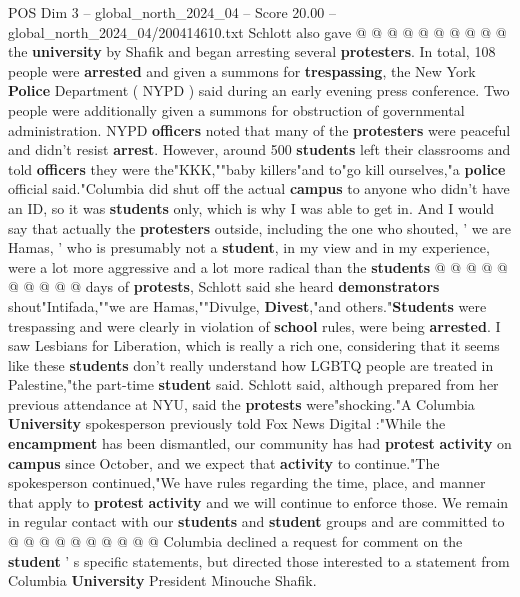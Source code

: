 \begin{textsample}{POS Dim 3 – global\_north\_2024\_04 – Score 20.00 – global\_north\_2024\_04/200414610.txt}
Schlott also gave @ @ @ @ @ @ @ @ @ @ the \textbf{university} by Shafik and began arresting several \textbf{protesters}.
In total, 108 people were \textbf{arrested} and given a summons for \textbf{trespassing}, the New York \textbf{Police} Department ( NYPD ) said during an early evening press conference.
Two people were additionally given a summons for obstruction of governmental administration.
NYPD \textbf{officers} noted that many of the \textbf{protesters} were peaceful and didn't resist \textbf{arrest}.
However, around 500 \textbf{students} left their classrooms and told \textbf{officers} they were the"KKK,""baby killers"and to"go kill ourselves,"a \textbf{police} official said."Columbia did shut off the actual \textbf{campus} to anyone who didn't have an ID, so it was \textbf{students} only, which is why I was able to get in.
And I would say that actually the \textbf{protesters} outside, including the one who shouted, ' we are Hamas, ' who is presumably not a \textbf{student}, in my view and in my experience, were a lot more aggressive and a lot more radical than the \textbf{students} @ @ @ @ @ @ @ @ @ @ days of \textbf{protests}, Schlott said she heard \textbf{demonstrators} shout"Intifada,""we are Hamas,""Divulge, \textbf{Divest},"and others."\textbf{Students} were trespassing and were clearly in violation of \textbf{school} rules, were being \textbf{arrested}.
I saw Lesbians for Liberation, which is really a rich one, considering that it seems like these \textbf{students} don't really understand how LGBTQ people are treated in Palestine,"the part-time \textbf{student} said.
Schlott said, although prepared from her previous attendance at NYU, said the \textbf{protests} were"shocking."A Columbia \textbf{University} spokesperson previously told Fox News Digital :"While the \textbf{encampment} has been dismantled, our community has had \textbf{protest} \textbf{activity} on \textbf{campus} since October, and we expect that \textbf{activity} to continue."The spokesperson continued,"We have rules regarding the time, place, and manner that apply to \textbf{protest} \textbf{activity} and we will continue to enforce those.
We remain in regular contact with our \textbf{students} and \textbf{student} groups and are committed to @ @ @ @ @ @ @ @ @ @ Columbia declined a request for comment on the \textbf{student} ' s specific statements, but directed those interested to a statement from Columbia \textbf{University} President Minouche Shafik.

\end{textsample}
